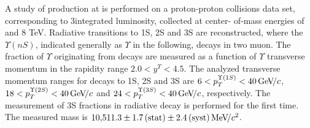A study of \chib production at \lhcb is performed on a proton-proton collisions
data set, corresponding to 3\invfb integrated luminosity, collected at center-
of-mass energies of  and 8 TeV. Radiative \chib transitions to
\Y1S, \Y2S and \Y3S are reconstructed, where the $\Upsilon(nS)$, indicated generally as $\Upsilon$ in the following, decays in two muon. 
The fraction of $\Upsilon$ originating from \chib decays
are measured as a function of $\Upsilon$ transverse momentum in the \lhcb rapidity range
$2.0 < y^{\Upsilon} < 4.5$. The analyzed transverse momentum ranges for decays
to \Y1S, \Y2S and \Y3S are $6<p_T^{\Y1S}<40\gevc$, $18<p_T^{\Y2S}<40\gevc$ and
$24<p_T^{\Y3S}<40\gevc$, respectively. The measurement of
\Y3S fractions in radiative \chibThreeP decay is performed for the first time.
The measured \chiboneThreeP mass is $10{,}511.3 \pm 1.7\mathrm{\,(stat)} \pm 2.4 \mathrm{\,(syst)} {\mathrm{\,Me\kern -0.1em V\!/}c^2}$.

